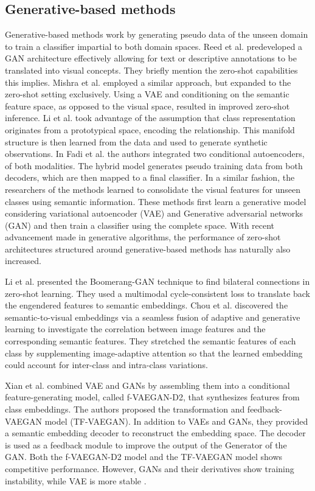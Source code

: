 \documentclass{article}
\begin{document}
\subsection{Generative-based methods}
Generative-based methods work by generating pseudo data of the unseen domain to train a classifier impartial to both domain spaces. Reed et al. \cite{b69} predeveloped a GAN architecture effectively allowing for text or descriptive annotations to be translated into visual concepts. They briefly mention the zero-shot capabilities this implies. Mishra et al. \cite{b35} employed a similar approach, but expanded to the zero-shot setting exclusively. Using a VAE and conditioning on the semantic feature space, as opposed to the visual space, resulted in improved zero-shot inference. Li et al. \cite{b8} took advantage of the assumption that class representation originates from a prototypical space, encoding the relationship. This manifold structure is then learned from the data and used to generate synthetic observations. In Fadi et al. \cite{b80} the authors integrated two conditional autoencoders, of both modalities. The hybrid model generates pseudo training data from both decoders, which are then mapped to a final classifier. In a similar fashion, the researchers of the methods \cite{b34, b35, b36, b37} learned to consolidate the visual features for unseen classes using semantic information. These methods first learn a generative model considering variational autoencoder (VAE) and Generative adversarial networks (GAN) and then train a classifier using the complete space. With recent advancement made in generative algorithms, the performance of zero-shot architectures structured around generative-based methods has naturally also increased.

Li et al. \cite{b39} presented the Boomerang-GAN technique to find bilateral connections in zero-shot learning. They used a multimodal cycle-consistent loss to translate back the engendered features to semantic embeddings. Chou et al. \cite{b40} discovered the semantic-to-visual embeddings via a seamless fusion of adaptive and generative learning to investigate the correlation between image features and the corresponding semantic features. They stretched the semantic features of each class by supplementing image-adaptive attention so that the learned embedding could account for inter-class and intra-class variations. 

Xian et al. \cite{b46} combined VAE and GANs by assembling them into a conditional feature-generating model, called f-VAEGAN-D2, that synthesizes features from class embeddings. The authors \cite{b47} proposed the transformation and feedback-VAEGAN model (TF-VAEGAN). In addition to VAEs and GANs, they provided a semantic embedding decoder to reconstruct the embedding space. The decoder is used as a feedback module to improve the output of the Generator of the GAN. Both the f-VAEGAN-D2 model \cite{b46} and the TF-VAEGAN model \cite{b47} shows competitive performance. However, GANs and their derivatives show training instability, while VAE is more stable  \cite{b48}. 
\end{document}
